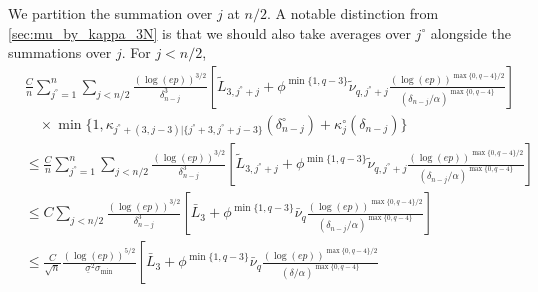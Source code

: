 \documentclass[aos]{imsart}
\begin{document}
\begin{appendix}
\medskip
{} 
We partition the summation over $j$ at 
$n/2$. A notable distinction from \cref{sec:mu_by_kappa_3N} is that we should also take averages over $j^\circ$ alongside the summations over $j$.
For $j < n/2$, 
\begin{equation*}
\begin{aligned}
    & \frac{C}{n} \sum_{j^\circ=1}^n \sum_{j < n/2} \frac{(\log(ep))^{3/2}}{\delta_{n-j}^3}  
    \left[ 
        \tilde{L}_{3,j^\circ+j}
        + \phi^{\min\{1, q-3\}} \tilde\nu_{q,j^\circ+j} \frac{ {(\log(ep))}^{\max\{0, q-4\}/2}}{(\delta_{n-j}/\alpha)^{\max\{0, q-4\}}}
    \right] \\
    & \quad \times \min\{1, \kappa_{j^\circ+(3,j-3)|\{j^\circ+3,j^\circ+j-3\}}(\delta_{n-j}^\circ) + \kappa^\circ_{j}(\delta_{n-j})\} \\
    & \leq \frac{C}{n} \sum_{j^\circ=1}^n \sum_{j < n/2} \frac{(\log(ep))^{3/2}}{\delta_{n-j}^3}  
    \left[ 
        \tilde{L}_{3,j^\circ+j}
        + \phi^{\min\{1, q-3\}} \tilde\nu_{q,j^\circ+j} \frac{ {(\log(ep))}^{\max\{0, q-4\}/2}}{(\delta_{n-j}/\alpha)^{\max\{0, q-4\}}}
    \right] \\
    & \leq C \sum_{j < n/2} \frac{(\log(ep))^{3/2}}{\delta_{n-j}^3} 
    \left[ 
        \bar{L}_{3}
        + \phi^{\min\{1, q-3\}} \bar\nu_{q} \frac{ {(\log(ep))}^{\max\{0, q-4\}/2}}{(\delta_{n-j}/\alpha)^{\max\{0, q-4\}}}
    \right] \\
    & \leq \frac{C}{\sqrt{n}} \frac{(\log(ep))^{5/2}}{\underline{\sigma}^2\sigma_{\min}}
    \left[ 
        \bar{L}_{3}
        + \phi^{\min\{1, q-3\}} \bar\nu_{q} \frac{ {(\log(ep))}^{\max\{0, q-4\}/2}}{(\delta/\alpha)^{\max\{0, q-4\}}}

\end{aligned}
\end{equation*}
\end{appendix}
\end{document}
